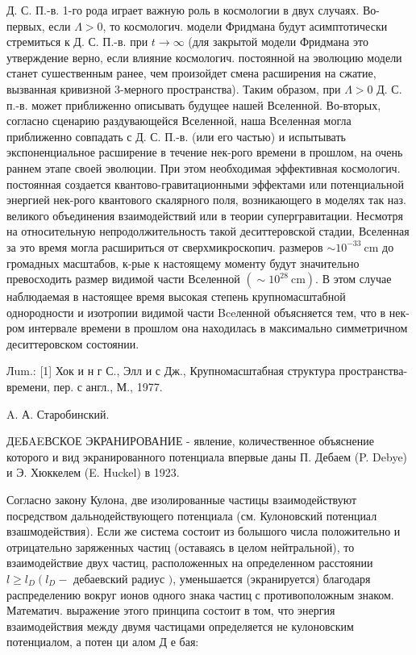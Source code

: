 \documentclass[10pt]{article}
\begin{document}
Д. С. П.-в. 1-го рода играет важную роль в космологии в двух случаях. Во-первых, если $\Lambda>0$, то космологич. модели Фридмана будут асимптотически стремиться к Д. С. П.-в. при $t \rightarrow \infty$ (для закрытой модели Фридмана это утверждение верно, если влияние космологич. постоянной на эволюцию модели станет сушественным ранее, чем произойдет смена расширения на сжатие, вызванная кривизной 3-мерного пространства). Таким образом, при $\Lambda>0$ Д. С. п.-в. может приближенно описывать будущее нашей Вселенной. Во-вторых, согласно сценарию раздувающейся Вселенной, наша Вселенная могла приближенно совпадать с Д. С. П.-в. (или его частью) и испытывать экспоненциальное расширение в течение нек-рого времени в прошлом, на очень раннем этапе своей эволюции. При этом необходимая эффективная космологич. постоянная создается квантово-гравитационными эффектами или потенциальной энергией нек-рого квантового скалярного поля, возникающего в моделях так наз. великого объединения взаимодействий или в теории супергравитации. Несмотря на относительную непродолжительность такой деситтеровской стадии, Вселенная за это время могла расшириться от сверхмикроскопич. размеров $\sim 10^{-33} \mathrm{~cm}$ до громадных масштабов, к-рые к настоящему моменту будут значительно превосходить размер видимой части Вселенной $\left(\sim 10^{28} \mathrm{~cm}\right)$. В этом случае наблюдаемая в настоящее время высокая степень крупномасштабной однородности и изотропии видимой части Bceленной объясняется тем, что в нек-ром интервале времени в прошлом она находилась в максимально симметричном деситтеровском состоянии.



Лum.: [1] Хок и н г С., Элл и с Дж., Крупномасштабная структура пространства-времени, пер. с англ., М., 1977.



A. А. Старобинский.



ДEБAEВСКОЕ ЭКРАНИРОВАНИЕ - явление, количественное объяснение которого и вид экранированного потенциала впервые даны П. Дебаем (P. Debye) и Э. Хюккелем (E. Huckel) в 1923.



Согласно закону Кулона, две изолированные частицы взаимодействуют посредством дальнодействующего потенциала (см. Кулоновский потенциал взашмодействия). Если же система состоит из болышого числа положительно и отрицательно заряженных частиц (оставаясь в целом нейтральной), то взаимодействие двух частиц, расположенных на определенном расстоянии $l \geqslant l_{D}\left(l_{D}-\right.$ дебаевский радиус $)$, уменьшается (экранируется) благодаря распределению вокруг ионов одного знака частиц с противоположным знаком. Математич. выражение этого принципа состоит в том, что энергия взаимодействия между двумя частицами определяется не кулоновским потенциалом, а потен ци алом Д е бая:
\end{document}
